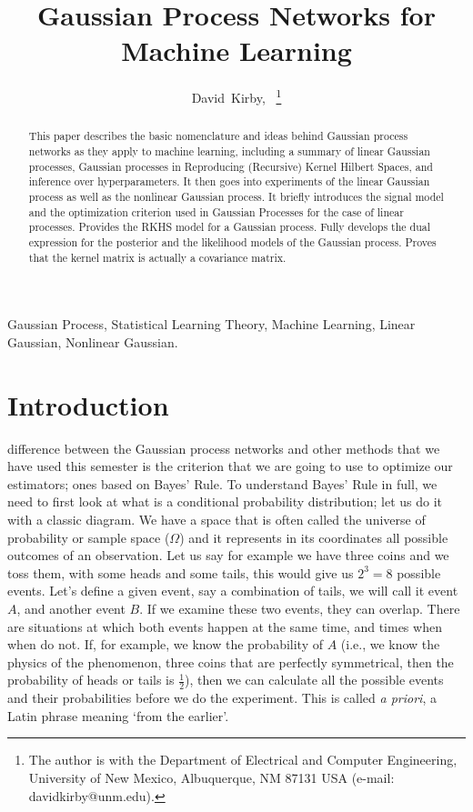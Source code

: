 \documentclass[journal]{IEEEtran}
\begin{document}
\title{Gaussian Process Networks for Machine Learning}%

\author{David~Kirby,~%
\thanks{The author is with the Department of Electrical and Computer Engineering, University of New Mexico, Albuquerque, NM 87131 USA (e-mail: davidkirby@unm.edu).}%
}

\maketitle
\begin{abstract}
    This paper describes the basic nomenclature and ideas behind Gaussian process networks as they apply to machine learning, including a summary of linear Gaussian processes, Gaussian processes in Reproducing (Recursive) Kernel Hilbert Spaces, and inference over hyperparameters. It then goes into experiments of the linear Gaussian process as well as the nonlinear Gaussian process. It briefly introduces the signal model and the optimization criterion used in Gaussian Processes for the case of linear processes. Provides the RKHS model for a Gaussian process. Fully develops the dual expression for the posterior and the likelihood models of the Gaussian process. Proves that the kernel matrix is actually a covariance matrix.
\end{abstract}
\begin{IEEEkeywords}
    Gaussian Process, Statistical Learning Theory, Machine Learning, Linear Gaussian, Nonlinear Gaussian.
\end{IEEEkeywords}

\section{Introduction}

 difference between the Gaussian process networks and other methods that we have used this semester is the criterion that we are going to use to optimize our estimators; ones based on Bayes' Rule. To understand Bayes' Rule in full, we need to first look at what is a conditional probability distribution; let us do it with a classic diagram. We have a space that is often called the universe of probability or sample space (\(\Omega\)) and it represents in its coordinates all possible outcomes of an observation. Let us say for example we have three coins and we toss them, with some heads and some tails, this would give us \(2^3=8\) possible events. Let's define a given event, say a combination of tails, we will call it event \(A\), and another event \(B\). If we examine these two events, they can overlap. There are situations at which both events happen at the same time, and times when when do not. If, for example, we know the probability of \(A\) (i.e., we know the physics of the phenomenon, three coins that are perfectly symmetrical, then the probability of heads or tails is \(\frac{1}{2}\)), then we can calculate all the possible events and their probabilities before we do the experiment. This is called \textit{a priori}, a Latin phrase meaning `from the earlier'.
\end{document}
